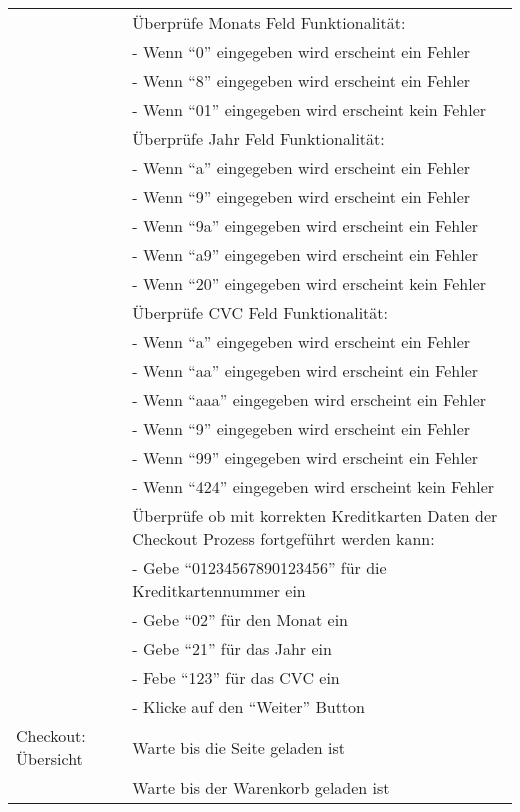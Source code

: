 \begin{table}[H]
\begin{tabularx}{0.9\textwidth}{ | l | X | }
		& Überprüfe Monats Feld Funktionalität: \\ \cline{2-2}
		& - Wenn "`0"' eingegeben wird erscheint ein Fehler \\ \cline{2-2}
		& - Wenn "`8"' eingegeben wird erscheint ein Fehler \\ \cline{2-2}
		& - Wenn "`01"' eingegeben wird erscheint kein Fehler \\ \cline{2-2}
		& Überprüfe Jahr Feld Funktionalität: \\ \cline{2-2}
		& - Wenn "`a"' eingegeben wird erscheint ein Fehler \\ \cline{2-2}
		& - Wenn "`9"' eingegeben wird erscheint ein Fehler \\ \cline{2-2}
		& - Wenn "`9a"' eingegeben wird erscheint ein Fehler \\ \cline{2-2}
		& - Wenn "`a9"' eingegeben wird erscheint ein Fehler \\ \cline{2-2}
		& - Wenn "`20"' eingegeben wird erscheint kein Fehler \\ \cline{2-2}
		& Überprüfe CVC Feld Funktionalität: \\ \cline{2-2}
		& - Wenn "`a"' eingegeben wird erscheint ein Fehler \\ \cline{2-2}
		& - Wenn "`aa"' eingegeben wird erscheint ein Fehler \\ \cline{2-2}
		& - Wenn "`aaa"' eingegeben wird erscheint ein Fehler \\ \cline{2-2}
		& - Wenn "`9"' eingegeben wird erscheint ein Fehler \\ \cline{2-2}
		& - Wenn "`99"' eingegeben wird erscheint ein Fehler \\ \cline{2-2}
		& - Wenn "`424"' eingegeben wird erscheint kein Fehler \\ \cline{2-2}
		& Überprüfe ob mit korrekten Kreditkarten Daten der Checkout Prozess fortgeführt werden kann: \\ \cline{2-2}
		& - Gebe "`01234567890123456"' für die Kreditkartennummer ein \\ \cline{2-2}
		& - Gebe "`02"' für den Monat ein \\ \cline{2-2}
		& - Gebe "`21"' für das Jahr ein \\ \cline{2-2}
		& - Febe "`123"' für das CVC ein \\ \cline{2-2}
		& - Klicke auf den "`Weiter"' Button \\ \cline{2-2}
		
		
		\multirow{1}{*}{Checkout: Übersicht} & Warte bis die Seite geladen ist \\ \cline{2-2}
		& Warte bis der Warenkorb geladen ist \\ \hline
	\end{tabularx} 
\end{table}